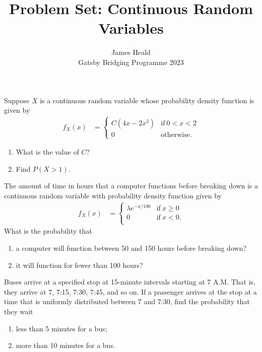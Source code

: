 \documentclass[10pt]{article}
\newenvironment{problem}[2][Problem]{\begin{trivlist}
\item[\hskip \labelsep {\bfseries #1}\hskip \labelsep {\bfseries #2.}]}{\end{trivlist}}
\begin{document}
 
\title{Problem Set: Continuous Random Variables}
\author{James Heald\\
Gatsby Bridging Programme 2023}
\date{}
\maketitle

\begin{problem}{1}
Suppose $X$ is a continuous random variable whose probability density function is given by
\begin{align*}
    f_X(x) &= 
    \begin{cases}
      C(4x-2x^2) & \text{if}\ 0 < x < 2 \\
      0 & \text{otherwise.}
    \end{cases}
\end{align*}
\begin{enumerate}[label=(\alph*)]
\item What is the value of $C$? 
\item Find $P(X > 1)$.
\end{enumerate}
\end{problem}

\begin{problem}{2}
The amount of time in hours that a computer functions before breaking down is a
continuous random variable with probability density function given by
\begin{align*}
    f_X(x) &= 
    \begin{cases}
      \lambda e^{-x/100} & \text{if}\ x \geq 0 \\
      0 & \text{if}\ x < 0.\\
    \end{cases}
\end{align*}
What is the probability that
\begin{enumerate}[label=(\alph*)]
\item a computer will function between 50 and 150 hours before breaking down?
\item it will function for fewer than 100 hours?
\end{enumerate}
\end{problem}
 
\begin{problem}{3}
Buses arrive at a specified stop at 15-minute intervals starting at 7 A.M. That is, they
arrive at 7, 7:15, 7:30, 7:45, and so on. If a passenger arrives at the stop at a time that
is uniformly distributed between 7 and 7:30, find the probability that they wait
\begin{enumerate}[label=(\alph*)]
\item less than 5 minutes for a bus;
\item more than 10 minutes for a bus.
\end{enumerate}
\end{problem}
\end{document}

